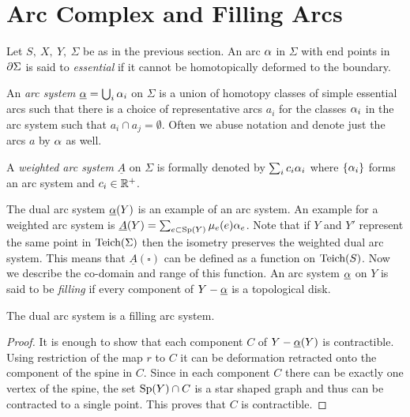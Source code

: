 \section{Arc Complex and Filling Arcs} 
Let $S,\ X,\ Y,\ \Sigma$ be as in the previous section. An arc $\alpha$ in $\Sigma$ with end points in $\partial \Sigma$ is said to \textit{essential} if it cannot be homotopically deformed to the boundary.   
\begin{definition}
  An \textit{arc system} $\underline{\alpha} = \bigcup_i \alpha_i$ on $\Sigma$ is a union of homotopy classes of simple essential arcs such that there is a choice of representative arcs $a_i$ for the classes $\alpha_i$ in the arc system such that $a_i\cap a_j = \emptyset$. Often we abuse notation and denote just the arcs $a$ by $\alpha$ as well. 
\end{definition}
\begin{definition}
  A \textit{weighted arc system} $\underline{A}$ on $\Sigma$ is formally denoted by $\sum_i c_i \alpha_i$ where $\{\alpha_i\}$ forms an arc system and $c_i\in \mathbb{R}^+$. 
\end{definition}
The dual arc system $\underline{\alpha}(Y)$ is an example of an arc system. An example for a weighted arc system is $\underline{A}(Y) = \sum_{e\subset \text{Sp}(Y)} \mu_e(e) \alpha_e$. Note that if $Y$ and $Y'$ represent the same point in $\text{Teich}(\Sigma)$ then the isometry preserves the weighted dual arc system. This means that $\underline{A}(\square)$ can be defined as a function on $\text{Teich}(S)$. Now we describe the co-domain and range of this function. An arc system $\underline{\alpha}$ on $Y$ is said to be \textit{filling} if every component of $Y-\underline{\alpha}$ is a topological disk. 
\begin{proposition}
  The dual arc system is a filling arc system.
\end{proposition}
\begin{proof}
  It is enough to show that each component $C$ of $Y- \underline{\alpha}(Y)$ is contractible. Using restriction of the map $r$ to $C$ it can be deformation retracted onto the component of the spine in $C$. Since in each component $C$ there can be exactly one vertex of the spine, the set $\text{Sp}(Y)\cap C$ is a star shaped graph and thus can be contracted to a single point. This proves that $C$ is contractible.
\end{proof}

